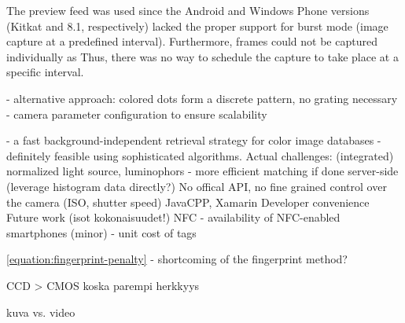 \documentclass[thesis.tex]{subfiles}
\begin{document}
The preview feed was used since the Android and Windows Phone versions (Kitkat and 8.1, respectively) lacked the proper support for burst mode (image capture at a predefined interval). Furthermore, frames could not be captured individually as Thus, there was no way to schedule the capture to take place at a specific interval.

- alternative approach: colored dots form a discrete pattern, no grating necessary
- camera parameter configuration to ensure scalability

- a fast background-independent retrieval strategy for color image databases
- definitely feasible using sophisticated algorithms. Actual challenges: (integrated) normalized light source, luminophors
- more efficient matching if done server-side (leverage histogram data directly?)
No offical API, no fine grained control over the camera (ISO, shutter speed)
JavaCPP, Xamarin
Developer convenience
Future work (isot kokonaisuudet!)
NFC
- availability of NFC-enabled smartphones (minor)
- unit cost of tags

\ref{equation:fingerprint-penalty} - shortcoming of the fingerprint method?

CCD > CMOS koska parempi herkkyys

kuva vs. video

\begin{comment}
Color calibration

There are mainly two modules responsible for the color-rendering accuracy of a digital camera: the former is the illuminant estimation and correction module, and the latter is the color matrix transformation aimed to adapt the color response of the sensor to a standard color space. These two modules together form what may be called the color correction pipeline.

RGB is a device-dependent color model: different devices detect or reproduce a given RGB value differently, since the color elements (such as phosphors or dyes) and their response to the individual R, G, and B levels vary from manufacturer to manufacturer, or even in the same device over time. Thus an RGB value does not define the same color across devices without some kind of color management.

\url{http://www.cis.rit.edu/~jxj1770/publications/paperEI_Xerox.pdf}

\url{http://www.cs.unc.edu/techreports/04-012.pdf}
\end{comment}
\end{document}
